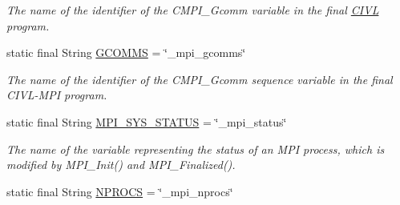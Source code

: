 \begin{DoxyCompactItemize}
\begin{DoxyCompactList}\small\item\em The name of the identifier of the C\+M\+P\+I\+\_\+\+Gcomm variable in the final \hyperlink{classedu_1_1udel_1_1cis_1_1vsl_1_1civl_1_1CIVL}{C\+I\+V\+L} program. \end{DoxyCompactList}\item 
\hypertarget{classedu_1_1udel_1_1cis_1_1vsl_1_1civl_1_1model_1_1IF_1_1ModelConfiguration_ac8d96456cac9268825ce54ff05e4e027}{}static final String \hyperlink{classedu_1_1udel_1_1cis_1_1vsl_1_1civl_1_1model_1_1IF_1_1ModelConfiguration_ac8d96456cac9268825ce54ff05e4e027}{G\+C\+O\+M\+M\+S} = \char`\"{}\+\_\+mpi\+\_\+gcomms\char`\"{}\label{classedu_1_1udel_1_1cis_1_1vsl_1_1civl_1_1model_1_1IF_1_1ModelConfiguration_ac8d96456cac9268825ce54ff05e4e027}

\begin{DoxyCompactList}\small\item\em The name of the identifier of the C\+M\+P\+I\+\_\+\+Gcomm sequence variable in the final C\+I\+V\+L-\/\+M\+P\+I program. \end{DoxyCompactList}\item 
\hypertarget{classedu_1_1udel_1_1cis_1_1vsl_1_1civl_1_1model_1_1IF_1_1ModelConfiguration_afd29f81746392439881f112f24909108}{}static final String \hyperlink{classedu_1_1udel_1_1cis_1_1vsl_1_1civl_1_1model_1_1IF_1_1ModelConfiguration_afd29f81746392439881f112f24909108}{M\+P\+I\+\_\+\+S\+Y\+S\+\_\+\+S\+T\+A\+T\+U\+S} = \char`\"{}\+\_\+mpi\+\_\+status\char`\"{}\label{classedu_1_1udel_1_1cis_1_1vsl_1_1civl_1_1model_1_1IF_1_1ModelConfiguration_afd29f81746392439881f112f24909108}

\begin{DoxyCompactList}\small\item\em The name of the variable representing the status of an M\+P\+I process, which is modified by M\+P\+I\+\_\+\+Init() and M\+P\+I\+\_\+\+Finalized(). \end{DoxyCompactList}\item 
\hypertarget{classedu_1_1udel_1_1cis_1_1vsl_1_1civl_1_1model_1_1IF_1_1ModelConfiguration_afa7764d2ba5be5407d7f22444d177263}{}static final String \hyperlink{classedu_1_1udel_1_1cis_1_1vsl_1_1civl_1_1model_1_1IF_1_1ModelConfiguration_afa7764d2ba5be5407d7f22444d177263}{N\+P\+R\+O\+C\+S} = \char`\"{}\+\_\+mpi\+\_\+nprocs\char`\"{}\label{classedu_1_1udel_1_1cis_1_1vsl_1_1civl_1_1model_1_1IF_1_1ModelConfiguration_afa7764d2ba5be5407d7f22444d177263}


\end{DoxyCompactItemize}
